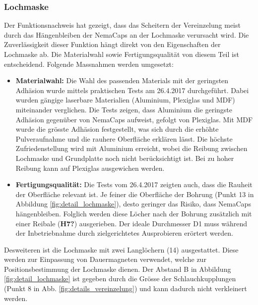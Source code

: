 \subsubsection{Lochmaske}
\label{lochmaske}
Der Funktionsnachweis hat gezeigt, dass das Scheitern der Vereinzelung meist durch das Hängenbleiben der NemaCaps an der Lochmaske verursacht wird. Die Zuverlässigkeit dieser Funktion hängt direkt von den Eigenschaften der Lochmaske ab. Die Materialwahl sowie Fertigungsqualität von diesem Teil ist entscheidend. 
\newline
Folgende Massnahmen werden umgesetzt:
\begin{itemize}
	\item \textbf{Materialwahl:} Die Wahl des passenden Materials mit der geringsten Adhäsion wurde mittels praktischen Tests am 26.4.2017 durchgeführt. Dabei wurden gängige laserbare Materialien (Aluminium, Plexiglas und MDF) miteinander verglichen. Die Tests zeigen, dass Aluminium die geringste Adhäsion gegenüber von NemaCaps aufweist, gefolgt von Plexiglas. Mit MDF wurde die grösste Adhäsion festgestellt, was sich durch die erhöhte Pulveraufnahme und die rauhere Oberfläche erklären lässt. 
	Die höchste Zufriedenstellung wird mit Aluminium erreicht, wobei die Reibung zwischen Lochmaske und Grundplatte noch nicht berücksichtigt ist. Bei zu hoher Reibung kann auf Plexiglas ausgewichen werden.
	
	\item \textbf{Fertigungsqualität:} Die Tests vom 26.4.2017 zeigten auch, dass die Rauheit der Oberfläche relevant ist. Je feiner die Oberfläche der Bohrung (Punkt 13 in Abbildung \ref{fig:detail_lochmaske}), desto geringer das Risiko, dass NemaCaps hängenbleiben. Folglich werden diese Löcher nach der Bohrung zusätzlich mit einer Reibale (\textbf{H7?}) ausgerieben. Der ideale Durchmesser D1 muss während der Inbetriebnahme durch zielgerichtetes Ausprobieren erörtert werden.
	
\end{itemize}
Desweiteren ist die Lochmaske mit zwei Langlöchern (14) ausgestattet. Diese werden zur Einpassung von Dauermagneten verwendet, welche zur Positionsbestimmung der Lochmaske dienen. Der Abstand B in Abbildung \ref{fig:detail_lochmaske} ist gegeben durch die Grösse der Schlauchkupplungen (Punkt 8 in Abb. \ref{fig:details_vereinzelung}) und kann dadurch nicht verkleinert werden.
